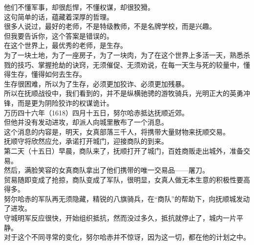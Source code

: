 \begin{multicols}{\theparacolNo}
他们不懂军事，却很彪悍，不懂权谋，却很狡猾。\\

这句简单的话，蕴藏着深厚的哲理。\\

很多人说过，最好的老师，不是特级教师，不是名牌学校，而是兴趣。\\

但我要告诉你，这个答案是错误的。\\

在这个世界上，最优秀的老师，是生存。\\

为了一块土地，为了一座房子，为了一块肉，为了在这个世界上多活一天，熟悉杀戮的技巧、掌握抢劫的诀窍，无须催促、无须劝说，在每一天生与死的较量中，懂得生存，懂得如何去生存。\\

生存很困难，所以为了生存，必须更加狡诈、必须更加残暴。\\

所以在抚顺战役中，我们看到的，并不是纵横驰骋的游牧骑兵，光明正大的英勇冲锋，而是更为阴险狡诈的权谋诡计。\\

万历四十六年（1618）四月十五日，努尔哈赤抵达抚顺近郊。\\

但他并没有发动进攻，却派人向城里散布了一个消息。\\

这个消息的内容是，明天，女真部落三千人，将携带大量财物来抚顺交易。\\

抚顺守将欣然应允，承诺打开城门，迎接商队的到来。\\

第二天（十五日）早晨，商队来了，抚顺打开了城门，百姓商贩走出城外，准备交易。\\

然后，满脸笑容的女真商队拿出了他们携带的唯一交易品——屠刀。\\

贸易随即变成了抢掠，商队变成了军队，很明显，女真人做无本生意的积极性要高得多。\\

努尔哈赤的军队再无须隐藏，精锐的八旗骑兵，在“商队”的帮助下，向抚顺城发动了进攻。\\

守城明军反应很快，开始组织抵抗，然而没过多久，抵抗就停止了，城内一片平静。\\

对于这个不同寻常的变化，努尔哈赤并不惊讶，因为这一切，都在他的计划之中。\\


\end{multicols}
